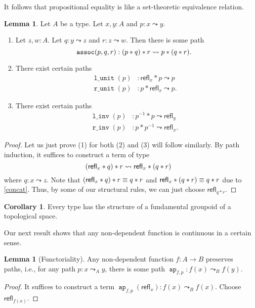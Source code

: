 \documentclass[10pt,letterpaper,cm]{nupset}
\theoremstyle{definition}
\theoremstyle{theorem}
\newtheorem{lemma}[definition]{Lemma}
\newtheorem{corollary}[definition]{Corollary}
\theoremstyle{remark}
\newcommand{\refl}{\mathsf{refl}}
\newcommand{\0}{\mathbf{0}}
\newcommand{\1}{\mathbf{1}}
\newcommand{\2}{\mathbf{2}}
\DeclareMathOperator{\assoc}{\mathtt{assoc}}
\DeclareMathOperator{\lunit}{\mathtt{l\_unit}}
\DeclareMathOperator{\runit}{\mathtt{r\_unit}}
\DeclareMathOperator{\linv}{\mathtt{l\_inv}}
\DeclareMathOperator{\rinv}{\mathtt{r\_inv}}
\DeclareMathOperator{\ap}{\mathtt{ap}}
\newcommand{\be}{\begin{enumerate}}
\newcommand{\ee}{\end{enumerate}}
\begin{document}
It follows that propositional equality is like a set-theoretic equivalence relation.

\begin{lemma} Let $A$ be a type. Let $x,y:A$ and  $p: x \leadsto y$.
\be[label=(\arabic*)]
\item Let $z, w : A$. Let  $q : y\leadsto z$ and $r : z \leadsto w$. Then there is some path $$ \assoc(p,q,r) : \mleft(p \ast q\mright) \ast r \leadsto p \ast \mleft(q \ast r\mright)    .$$
\item  There exist certain paths
\begin{align*}
\lunit(p) & : \refl_x \ast p \leadsto p
\\ \runit(p) &: p \ast \refl_x \leadsto p.
\end{align*}
\item There exist certain paths
\begin{align*}
\linv(p) & : p^{-1}\ast p \leadsto 	\refl_y
\\ \rinv(p) &: p \ast p^{-1} \leadsto \refl_x.
\end{align*}
\ee
\end{lemma}
\begin{proof}
Let us just prove (1) for both (2) and (3) will follow similarly. By path induction, it suffices to construct a term of type
\[
\mleft(\refl_x \ast q\mright) \ast r \leadsto \refl_x \ast \mleft(q \ast r\mright)
\] where $q: x \leadsto z$. Note that $\mleft(\refl_x \ast q\mright) \ast r \equiv q \ast r$ and  $\refl_x \ast \mleft(q \ast r\mright) \equiv q \ast r   $ due to \cref{concat}.   Thus, by some of our structural rules, we can just choose $\refl_{q\ast r}$.
\end{proof}

\begin{corollary}\label{groupoid} 
Every type has the structure of a fundamental groupoid of a topological space.
\end{corollary}

Our next result  shows that any non-dependent function is continuous in a certain sense.

\begin{lemma}[Functoriality] \label{functor}
Any non-dependent function $f: A \to B$ preserves paths, i.e., for any path $p: x \leadsto_A y$, there is some path $\ap_{f,p} : f(x) \leadsto_B f(y)$.
\end{lemma}
\begin{proof}
It suffices to construct a term $\ap_{f, p}(\refl_x) : f(x) \leadsto_B f(x)$. Choose $\refl_{f(x)}$.
\end{proof}
\end{document}

